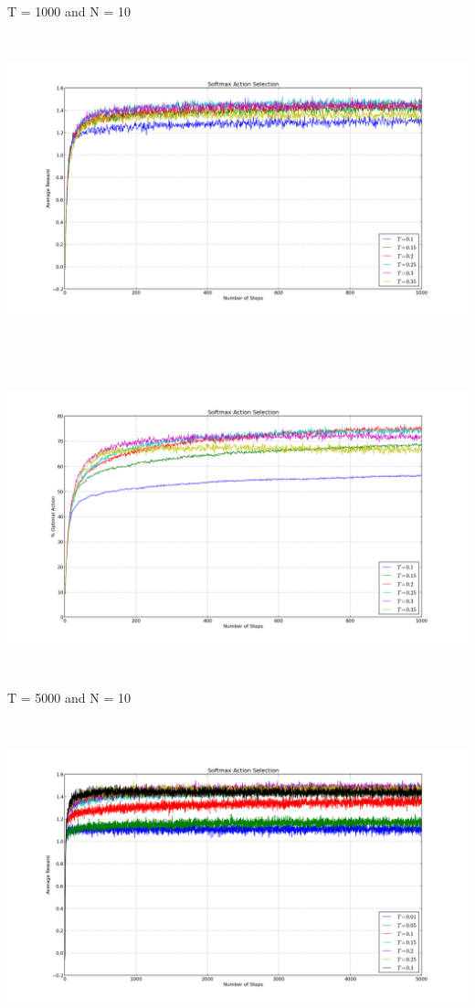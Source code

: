 \documentclass[a4paper,10pt]{report}
\newenvironment{my_itemize}{
\begin{itemize}
  \setlength{\itemsep}{1pt}
  \setlength{\parskip}{0pt}
  \setlength{\parsep}{0pt}}{
\end{itemize}}
\begin{document}
\begin{my_itemize}
\item T = 1000 and N = 10
\begin{center}
\centerline{\includegraphics*[width=180mm, height=90mm]{SoftRew-10-1000.png}}
\end{center}
\begin{center}
\centerline{\includegraphics*[width=180mm, height=90mm]{SoftOpt-10-1000.png}}
\end{center}
\pagebreak
\item T = 5000 and N = 10
\begin{center}
\centerline{\includegraphics*[width=180mm, height=90mm]{SoftRew-10-5000.png}}

\end{center}
\end{my_itemize}
\end{document}

